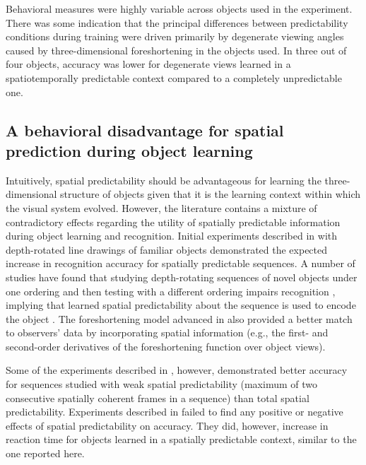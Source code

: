 \documentclass[dwyatte_dissertation.tex]{subfiles}
\begin{document}
Behavioral measures were highly variable across objects used in the experiment. There was some indication that the principal differences between predictability conditions during training were driven primarily by degenerate viewing angles caused by three-dimensional foreshortening in the objects used. In three out of four objects, accuracy was lower for degenerate views learned in a spatiotemporally predictable context compared to a completely unpredictable one.

\subsection{A behavioral disadvantage for spatial prediction during object learning}
Intuitively, spatial predictability should be advantageous for learning the three-dimensional structure of objects given that it is the learning context within which the visual system evolved. However, the literature contains a mixture of contradictory effects regarding the utility of spatially predictable information during object learning and recognition. Initial experiments described in  with depth-rotated line drawings of familiar objects demonstrated the expected increase in recognition accuracy for spatially predictable sequences. A number of studies have found that studying depth-rotating sequences of novel objects under one ordering and then testing with a different ordering impairs recognition \cite{Stone98,VuongTarr04,ChuangVuongBulthoff12}, implying that learned spatial predictability about the sequence is used to encode the object \cite{BalasSinha09c}. The foreshortening model advanced in \cite{BalasSinha09b} also provided a better match to observers' data by incorporating spatial information (e.g., the first- and second-order derivatives of the foreshortening function over object views).

Some of the experiments described in , however, demonstrated better accuracy for sequences studied with weak spatial predictability (maximum of two consecutive spatially coherent frames in a sequence) than total spatial predictability. Experiments described in  failed to find any positive or negative effects of spatial predictability on accuracy. They did, however, increase in reaction time for objects learned in a spatially predictable context, similar to the one reported here. 
\end{document}
